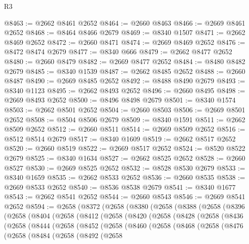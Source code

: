 \begin{lexlean}{R3}
\begin{coremodule}
@8463 := @2662 @8461 @2652
@8464 := @2660 @8463
@8466 := @2669 @8461 @2652
@8468 := @8464 @8466 @2679
@8469 := @8340 @1507
@8471 := @2662 @8469 @2652
@8472 := @2660 @8471
@8474 := @2669 @8469 @2652
@8476 := @8472 @8474 @2679
@8477 := @8340 @666
@8479 := @2662 @8477 @2652
@8480 := @2660 @8479
@8482 := @2669 @8477 @2652
@8484 := @8480 @8482 @2679
@8485 := @8340 @1539
@8487 := @2662 @8485 @2652
@8488 := @2660 @8487
@8490 := @2669 @8485 @2652
@8492 := @8488 @8490 @2679
@8493 := @8340 @1123
@8495 := @2662 @8493 @2652
@8496 := @2660 @8495
@8498 := @2669 @8493 @2652
@8500 := @8496 @8498 @2679
@8501 := @8340 @1574
@8503 := @2662 @8501 @2652
@8504 := @2660 @8503
@8506 := @2669 @8501 @2652
@8508 := @8504 @8506 @2679
@8509 := @8340 @1591
@8511 := @2662 @8509 @2652
@8512 := @2660 @8511
@8514 := @2669 @8509 @2652
@8516 := @8512 @8514 @2679
@8517 := @8340 @1609
@8519 := @2662 @8517 @2652
@8520 := @2660 @8519
@8522 := @2669 @8517 @2652
@8524 := @8520 @8522 @2679
@8525 := @8340 @1634
@8527 := @2662 @8525 @2652
@8528 := @2660 @8527
@8530 := @2669 @8525 @2652
@8532 := @8528 @8530 @2679
@8533 := @8340 @1659
@8535 := @2662 @8533 @2652
@8536 := @2660 @8535
@8538 := @2669 @8533 @2652
@8540 := @8536 @8538 @2679
@8541 := @8340 @1677
@8543 := @2662 @8541 @2652
@8544 := @2660 @8543
@8546 := @2669 @8541 @2652
@8594 := @2658
    (@8372
      (@2658
        (@8380
          (@2658
            (@8388
              (@2658
                (@8396
                  (@2658
                    (@8404
                      (@2658
                        (@8412
                          (@2658
                            (@8420
                              (@2658
                                (@8428
                                  (@2658
                                    (@8436
                                      (@2658
                                        (@8444
                                          (@2658
                                            (@8452
                                              (@2658
                                                (@8460
                                                  (@2658
                                                    (@8468
                                                      (@2658
                                                        (@8476
                                                          (@2658
                                                            (@8484
                                                              (@2658
                                                                (@8492
                                                                  (@2658

\end{coremodule}
\end{lexlean}
